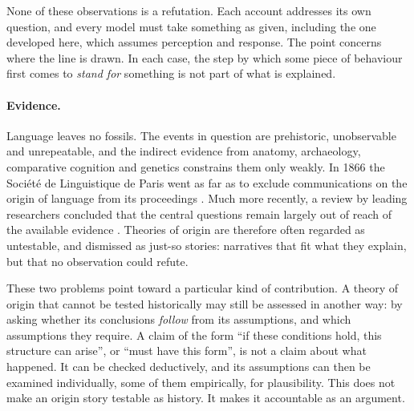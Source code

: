 \documentclass[11pt]{article}
\begin{document}
None of these observations is a refutation. Each account addresses its own question, and
every model must take something as given, including the one developed here, which
assumes perception and response. The point concerns where the line is drawn. In each
case, the step by which some piece of behaviour first comes to \emph{stand for} something
is not part of what is explained.

\paragraph{Evidence.}
Language leaves no fossils. The events in question are prehistoric, unobservable and
unrepeatable, and the indirect evidence from anatomy, archaeology, comparative cognition
and genetics constrains them only weakly. In 1866 the Soci\'et\'e de Linguistique de
Paris went as far as to exclude communications on the origin of language from its
proceedings \cite{Lyons1991}. Much more recently, a review by leading researchers
concluded that the central questions remain largely out of reach of the available
evidence \cite{Hauser2014}. Theories of origin are therefore often regarded as
untestable, and dismissed as just-so stories: narratives that fit what they explain, but
that no observation could refute.

These two problems point toward a particular kind of contribution. A theory of origin
that cannot be tested historically may still be assessed in another way: by asking
whether its conclusions \emph{follow} from its assumptions, and which assumptions they
require. A claim of the form ``if these conditions hold, this structure can arise'', or
``must have this form'', is not a claim about what happened. It can be checked
deductively, and its assumptions can then be examined individually, some of them
empirically, for plausibility. This does not make an origin story testable as history. It
makes it accountable as an argument.
\end{document}

